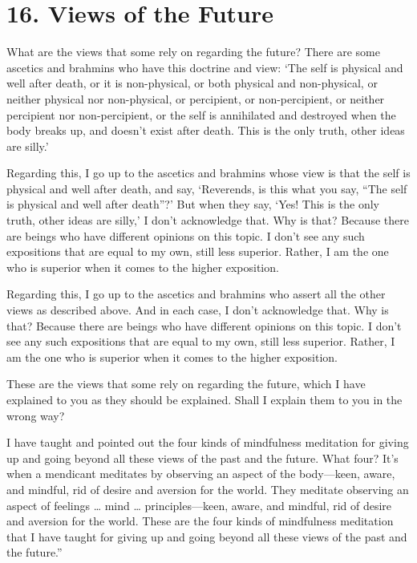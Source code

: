 \documentclass[12pt,openany]{book}%
\begin{document}
\section*{16. Views of the Future }

What are the views that some rely on regarding the future? There are some ascetics and brahmins who have this doctrine and view: ‘The self is physical and well after death, or it is non-physical, or both physical and non-physical, or neither physical nor non-physical, or percipient, or non-percipient, or neither percipient nor non-percipient, or the self is annihilated and destroyed when the body breaks up, and doesn’t exist after death. This is the only truth, other ideas are silly.’ 

Regarding this, I go up to the ascetics and brahmins whose view is that the self is physical and well after death, and say, ‘Reverends, is this what you say, “The self is physical and well after death”?’ But when they say, ‘Yes! This is the only truth, other ideas are silly,’ I don’t acknowledge that. Why is that? Because there are beings who have different opinions on this topic. I don’t see any such expositions that are equal to my own, still less superior. Rather, I am the one who is superior when it comes to the higher exposition. 

Regarding this, I go up to the ascetics and brahmins who assert all the other views as described above. And in each case, I don’t acknowledge that. Why is that? Because there are beings who have different opinions on this topic. I don’t see any such expositions that are equal to my own, still less superior. Rather, I am the one who is superior when it comes to the higher exposition. 

These are the views that some rely on regarding the future, which I have explained to you as they should be explained. Shall I explain them to you in the wrong way? 

I have taught and pointed out the four kinds of mindfulness meditation for giving up and going beyond all these views of the past and the future. What four? It’s when a mendicant meditates by observing an aspect of the body—keen, aware, and mindful, rid of desire and aversion for the world. They meditate observing an aspect of feelings … mind … principles—keen, aware, and mindful, rid of desire and aversion for the world. These are the four kinds of mindfulness meditation that I have taught for giving up and going beyond all these views of the past and the future.” 
\end{document}

